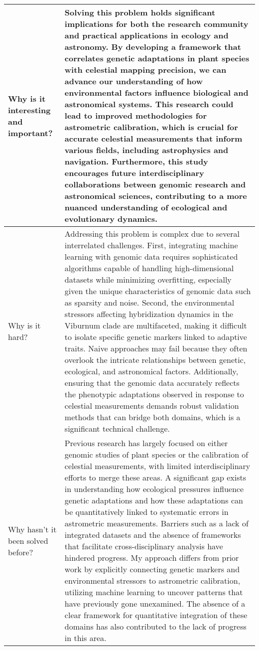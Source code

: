 \begin{table*}[htbp]
\begin{tabular}{p{3.5cm}p{12cm}}
Why is it interesting and important? & 
Solving this problem holds significant implications for both the research community and practical applications in ecology and astronomy. By developing a framework that correlates genetic adaptations in plant species with celestial mapping precision, we can advance our understanding of how environmental factors influence biological and astronomical systems. This research could lead to improved methodologies for astrometric calibration, which is crucial for accurate celestial measurements that inform various fields, including astrophysics and navigation. Furthermore, this study encourages future interdisciplinary collaborations between genomic research and astronomical sciences, contributing to a more nuanced understanding of ecological and evolutionary dynamics.\\ \midrule
Why is it hard? & 
Addressing this problem is complex due to several interrelated challenges. First, integrating machine learning with genomic data requires sophisticated algorithms capable of handling high-dimensional datasets while minimizing overfitting, especially given the unique characteristics of genomic data such as sparsity and noise. Second, the environmental stressors affecting hybridization dynamics in the Viburnum clade are multifaceted, making it difficult to isolate specific genetic markers linked to adaptive traits. Naive approaches may fail because they often overlook the intricate relationships between genetic, ecological, and astronomical factors. Additionally, ensuring that the genomic data accurately reflects the phenotypic adaptations observed in response to celestial measurements demands robust validation methods that can bridge both domains, which is a significant technical challenge.\\ \midrule
Why hasn't it been solved before? & 
Previous research has largely focused on either genomic studies of plant species or the calibration of celestial measurements, with limited interdisciplinary efforts to merge these areas. A significant gap exists in understanding how ecological pressures influence genetic adaptations and how these adaptations can be quantitatively linked to systematic errors in astrometric measurements. Barriers such as a lack of integrated datasets and the absence of frameworks that facilitate cross-disciplinary analysis have hindered progress. My approach differs from prior work by explicitly connecting genetic markers and environmental stressors to astrometric calibration, utilizing machine learning to uncover patterns that have previously gone unexamined. The absence of a clear framework for quantitative integration of these domains has also contributed to the lack of progress in this area.\\ \midrule

\end{tabular}
\end{table*}
